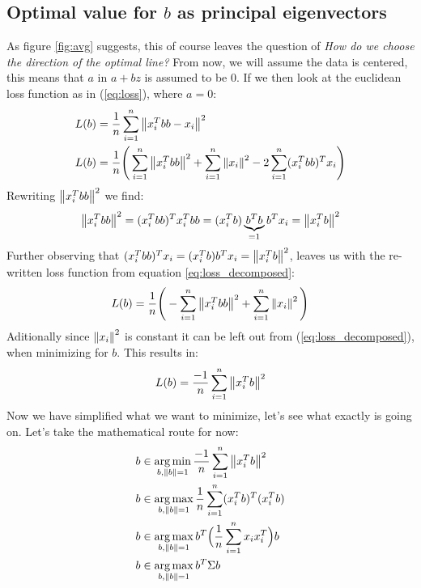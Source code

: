 \subsection{Optimal value for $b$ as principal eigenvectors}
As figure \ref{fig:avg} suggests, this of course leaves 
the question of \textit{How do we choose the direction of the optimal line?}
From now, we will assume the data is centered, this means that
$a$ in $a+bz$ is assumed to be $0$. If we then look at the 
euclidean loss function as in (\ref{eq:loss}), 
where $a=0$:
\begin{equation}
	\begin{split}
	L(b) &= \frac{1}{n}
		\sum_{i=1}^{n}\left\lVert x_i^Tbb - x_i\right\rVert^2 \\
	L(b) &= \frac{1}{n}\Bigg(
		\sum_{i=1}^{n}\left\lVert x_i^Tbb\right\rVert^2 +
		\sum_{i=1}^{n} \left\lVert x_i\right\rVert^2 - 
		2\sum_{i=1}^{n} (x_i^Tbb)^Tx_i \Bigg)\\
	\end{split}		
	\label{eq:loss_decomposed}		
\end{equation}
Rewriting $\left\lVert x_i^Tbb\right\rVert^2$ we find:
\begin{equation}
\left\lVert x_i^Tbb\right\rVert^2 = (x_i^Tbb)^Tx_i^Tbb = 
	(x_i^Tb)\underbrace{b^Tb}_{=1}b^Tx_i = \left\lVert x_i^Tb\right\rVert^2
\end{equation}
Further observing that $(x_i^Tbb)^Tx_i = (x_i^Tb)b^Tx_i = \left\lVert x_i^Tb\right\rVert^2$,
leaves us with the re-written loss function from equation
\ref{eq:loss_decomposed}:
\begin{equation}
\begin{split}
L(b) = \frac{1}{n}\Bigg(
	-\sum_{i=1}^{n}\left\lVert x_i^Tbb\right\rVert^2 +
	\sum_{i=1}^{n} \left\lVert x_i\right\rVert^2\Bigg)\\
\end{split}	
\end{equation}
Aditionally since $\left\lVert x_i\right\rVert^2$ is constant it can be 
left out from (\ref{eq:loss_decomposed}), when minimizing
for $b$. This results in:
\begin{equation}
\begin{split}
	L(b) = \frac{-1}{n}\sum_{i=1}^{n} \left\lVert x_i^Tb\right\rVert^2 \\
\end{split}			
\end{equation}
Now we have simplified what we want to minimize, let's 
see what exactly is going on. Let's take the mathematical
route for now:
\begin{equation}
\label{eq:sample_var}
\begin{split}
	b&\in\operatorname*{arg\,min}_{b, \left\lVert b\right\rVert = 1}
		\frac{-1}{n}\sum_{i=1}^{n} \left\lVert x_i^Tb\right\rVert^2 \\
	b&\in\operatorname*{arg\,max}_{b, \left\lVert b\right\rVert = 1}
		\frac{1}{n}\sum_{i=1}^{n} (x_i^Tb)^T(x_i^Tb) \\
	b&\in\operatorname*{arg\,max}_{b, \left\lVert b\right\rVert = 1} 
		b^T\Big(\frac{1}{n}\sum_{i=1}^{n} x_ix_i^T\Big)b \\					
	b&\in\operatorname*{arg\,max}_{b, \left\lVert b\right\rVert = 1}
		 b^T \Sigma b \\
\end{split}			
\end{equation}
